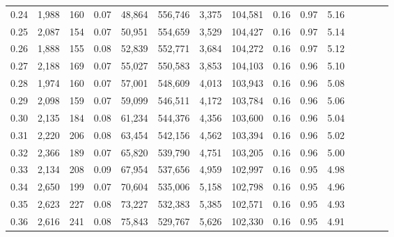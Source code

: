 \begin{tabular}{rrrcrrrrrrrrrrr}
0.24 &   1,988 &    160 &                                       0.07 &   48,864 &  556,746 &    3,375 &  104,581 &  0.16 &  0.97 &                         5.16 \\
0.25 &   2,087 &    154 &                                       0.07 &   50,951 &  554,659 &    3,529 &  104,427 &  0.16 &  0.97 &                         5.14 \\
0.26 &   1,888 &    155 &                                       0.08 &   52,839 &  552,771 &    3,684 &  104,272 &  0.16 &  0.97 &                         5.12 \\
0.27 &   2,188 &    169 &                                       0.07 &   55,027 &  550,583 &    3,853 &  104,103 &  0.16 &  0.96 &                         5.10 \\
0.28 &   1,974 &    160 &                                       0.07 &   57,001 &  548,609 &    4,013 &  103,943 &  0.16 &  0.96 &                         5.08 \\
0.29 &   2,098 &    159 &                                       0.07 &   59,099 &  546,511 &    4,172 &  103,784 &  0.16 &  0.96 &                         5.06 \\
0.30 &   2,135 &    184 &                                       0.08 &   61,234 &  544,376 &    4,356 &  103,600 &  0.16 &  0.96 &                         5.04 \\
0.31 &   2,220 &    206 &                                       0.08 &   63,454 &  542,156 &    4,562 &  103,394 &  0.16 &  0.96 &                         5.02 \\
0.32 &   2,366 &    189 &                                       0.07 &   65,820 &  539,790 &    4,751 &  103,205 &  0.16 &  0.96 &                         5.00 \\
0.33 &   2,134 &    208 &                                       0.09 &   67,954 &  537,656 &    4,959 &  102,997 &  0.16 &  0.95 &                         4.98 \\
0.34 &   2,650 &    199 &                                       0.07 &   70,604 &  535,006 &    5,158 &  102,798 &  0.16 &  0.95 &                         4.96 \\
0.35 &   2,623 &    227 &                                       0.08 &   73,227 &  532,383 &    5,385 &  102,571 &  0.16 &  0.95 &                         4.93 \\
0.36 &   2,616 &    241 &                                       0.08 &   75,843 &  529,767 &    5,626 &  102,330 &  0.16 &  0.95 &                         4.91 \\

\end{tabular}
